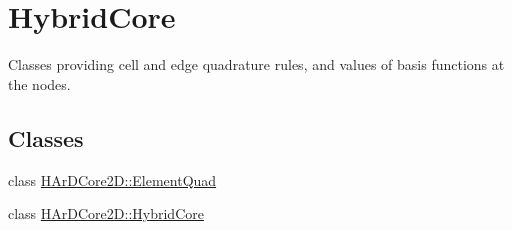 \hypertarget{group__HybridCore}{}\section{Hybrid\+Core}
\label{group__HybridCore}


Classes providing cell and edge quadrature rules, and values of basis functions at the nodes.  


\subsection*{Classes}
\begin{DoxyCompactItemize}
\item 
class \hyperlink{classHArDCore2D_1_1ElementQuad}{H\+Ar\+D\+Core2\+D\+::\+Element\+Quad}
\item 
class \hyperlink{classHArDCore2D_1_1HybridCore}{H\+Ar\+D\+Core2\+D\+::\+Hybrid\+Core}
\end{DoxyCompactItemize}
